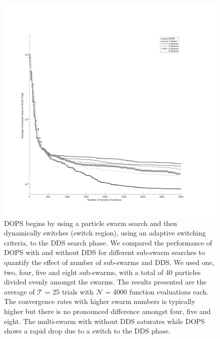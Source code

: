 \documentclass{bmcart}
\def\texttt{[image: ]}
\begin{document}
\begin{backmatter}
\begin{figure}[h!]
\centering
\includegraphics[width = 1.0\textwidth]{./rachelfigs/RecreateFigure7}
\caption{
DOPS begins by using a particle swarm search and then dynamically switches (switch region), using an adaptive switching criteria, to the DDS search phase.
We compared the performance of DOPS with and without DDS for different sub-swarm searches to quantify the effect of number of sub-swarms and DDS.
We used one, two, four, five and eight sub-swarms, with a total of 40 particles divided evenly amongst the swarms.
The results presented are the average of $\mathcal{T}$ = 25 trials with $\mathcal{N}$ = 4000 function evaluations each.
The convergence rates with higher swarm numbers is typically higher but there is no pronounced difference amongst four, five and eight.
The multi-swarm with without DDS saturates while DOPS shows a rapid drop due to a switch to the DDS phase.
}\label{fig-sub-swarms}
\end{figure}


\end{backmatter}
\end{document}
